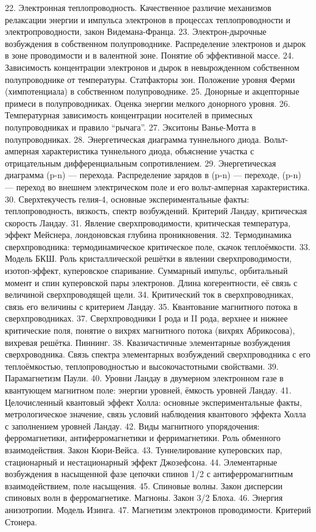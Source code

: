 22. Электронная теплопроводность. Качественное различие механизмов релаксации энергии и импульса электронов в процессах теплопроводности и электропроводности, закон Видемана-Франца.
23. Электрон-дырочные возбуждения в собственном полупроводнике. Распределение электронов и дырок в зоне проводимости и в валентной зоне. Понятие об эффективной массе.
24. Зависимость концентрации электронов и дырок в невырожденном собственном полупроводнике от температуры. Статфакторы зон. Положение уровня Ферми (химпотенциала) в собственном полупроводнике.
25. Донорные и акцепторные примеси в полупроводниках. Оценка энергии мелкого донорного уровня.
26. Температурная зависимость концентрации носителей в примесных полупроводниках и правило ``рычага''.
27. Экситоны Ванье-Мотта в полупроводниках.
28. Энергетическая диаграмма туннельного диода. Вольт-амперная характеристика туннельного диода, объяснение участка с отрицательным дифференциальным сопротивлением.
29. Энергетическая диаграмма (p-n) — перехода. Распределение зарядов в (p-n) — переходе, (p-n) — переход во внешнем электрическом поле и его вольт-амперная характеристика.
30. Сверхтекучесть гелия-4, основные экспериментальные факты: теплопроводность, вязкость, спектр возбуждений. Критерий Ландау, критическая скорость Ландау.
31. Явление сверхпроводимости, критическая температура, эффект Мейснера, лондоновская глубина проникновения.
32. Термодинамика сверхпроводника: термодинамическое критическое поле, скачок теплоёмкости.
33. Модель БКШ. Роль кристаллической решётки в явлении сверхпроводимости, изотоп-эффект, куперовское спаривание. Суммарный импульс, орбитальный момент и спин куперовской пары электронов. Длина когерентности, её связь с величиной сверхпроводящей щели.
34. Критический ток в сверхпроводниках, связь его величины с критерием Ландау.
35. Квантование магнитного потока в сверхпроводниках.
37. Сверхпроводники I рода и II рода, верхнее и нижнее критические поля, понятие о вихрях магнитного потока (вихрях Абрикосова), вихревая решётка. Пиннинг.
38. Квазичастичные элементарные возбуждения сверхроводника. Связь спектра элементарных возбуждений сверхпроводника с его теплоёмкостью, теплопроводностью и высокочастотными свойствами.
39. Парамагнетизм Паули.
40. Уровни Ландау в двумерном электронном газе в квантующем магнитном поле: энергии уровней, ёмкость уровней Ландау.
41. Целочисленный квантовый эффект Холла: основные экспериментальные факты, метрологическое значение, связь условий наблюдения квантового эффекта Холла с заполнением уровней Ландау.
42. Виды магнитного упорядочения: ферромагнетики, антиферромагнетики и ферримагнетики. Роль обменного взаимодействия. Закон Кюри-Вейса.
43. Туннелирование куперовских пар, стационарный и нестационарный эффект Джозефсона.
44. Элементарные возбуждения в насыщенной фазе цепочки спинов 1/2 с антиферромагнитным взаимодействием, поле насыщения.
45. Спиновые волны. Закон дисперсии спиновых волн в ферромагнетике. Магноны. Закон 3/2 Блоха.
46. Энергия анизотропии. Модель Изинга.
47. Магнетизм электронов проводимости. Критерий Стонера.	